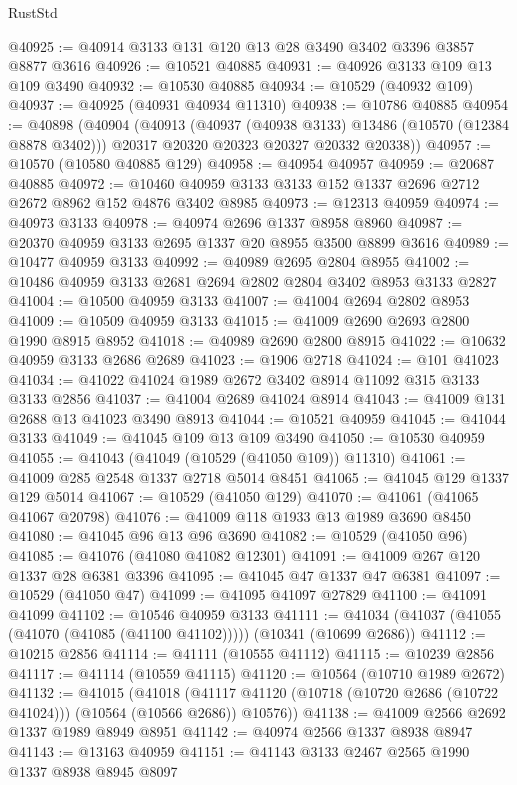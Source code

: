 \begin{lexlean}{RustStd}
\begin{coremodule}
@40925 := @40914 @3133 @131 @120 @13 @28 @3490 @3402 @3396 @3857 @8877 @3616
@40926 := @10521 @40885
@40931 := @40926 @3133 @109 @13 @109 @3490
@40932 := @10530 @40885
@40934 := @10529 (@40932 @109)
@40937 := @40925 (@40931 @40934 @11310)
@40938 := @10786 @40885
@40954 := @40898
    (@40904
      (@40913
        (@40937 (@40938 @3133) @13486 (@10570 (@12384 @8878 @3402)))
        @20317
        @20320
        @20323
        @20327
        @20332
        @20338))
@40957 := @10570 (@10580 @40885 @129)
@40958 := @40954 @40957
@40959 := @20687 @40885
@40972 := @10460 @40959 @3133 @3133 @152 @1337 @2696 @2712 @2672 @8962 @152 @4876 @3402 @8985
@40973 := @12313 @40959
@40974 := @40973 @3133
@40978 := @40974 @2696 @1337 @8958 @8960
@40987 := @20370 @40959 @3133 @2695 @1337 @20 @8955 @3500 @8899 @3616
@40989 := @10477 @40959 @3133
@40992 := @40989 @2695 @2804 @8955
@41002 := @10486 @40959 @3133 @2681 @2694 @2802 @2804 @3402 @8953 @3133 @2827
@41004 := @10500 @40959 @3133
@41007 := @41004 @2694 @2802 @8953
@41009 := @10509 @40959 @3133
@41015 := @41009 @2690 @2693 @2800 @1990 @8915 @8952
@41018 := @40989 @2690 @2800 @8915
@41022 := @10632 @40959 @3133 @2686 @2689
@41023 := @1906 @2718
@41024 := @101 @41023
@41034 := @41022 @41024 @1989 @2672 @3402 @8914 @11092 @315 @3133 @3133 @2856
@41037 := @41004 @2689 @41024 @8914
@41043 := @41009 @131 @2688 @13 @41023 @3490 @8913
@41044 := @10521 @40959
@41045 := @41044 @3133
@41049 := @41045 @109 @13 @109 @3490
@41050 := @10530 @40959
@41055 := @41043 (@41049 (@10529 (@41050 @109)) @11310)
@41061 := @41009 @285 @2548 @1337 @2718 @5014 @8451
@41065 := @41045 @129 @1337 @129 @5014
@41067 := @10529 (@41050 @129)
@41070 := @41061 (@41065 @41067 @20798)
@41076 := @41009 @118 @1933 @13 @1989 @3690 @8450
@41080 := @41045 @96 @13 @96 @3690
@41082 := @10529 (@41050 @96)
@41085 := @41076 (@41080 @41082 @12301)
@41091 := @41009 @267 @120 @1337 @28 @6381 @3396
@41095 := @41045 @47 @1337 @47 @6381
@41097 := @10529 (@41050 @47)
@41099 := @41095 @41097 @27829
@41100 := @41091 @41099
@41102 := @10546 @40959 @3133
@41111 := @41034 (@41037 (@41055 (@41070 (@41085 (@41100 @41102))))) (@10341 (@10699 @2686))
@41112 := @10215 @2856
@41114 := @41111 (@10555 @41112)
@41115 := @10239 @2856
@41117 := @41114 (@10559 @41115)
@41120 := @10564 (@10710 @1989 @2672)
@41132 := @41015
    (@41018 (@41117 @41120 (@10718 (@10720 @2686 (@10722 @41024))) (@10564 (@10566 @2686)) @10576))
@41138 := @41009 @2566 @2692 @1337 @1989 @8949 @8951
@41142 := @40974 @2566 @1337 @8938 @8947
@41143 := @13163 @40959
@41151 := @41143 @3133 @2467 @2565 @1990 @1337 @8938 @8945 @8097

\end{coremodule}
\end{lexlean}
